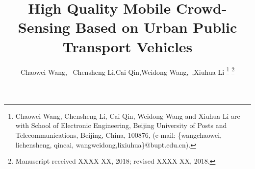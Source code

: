 \documentclass[journal]{IEEEtran}
\begin{document}
%
\title{High Quality Mobile Crowd-Sensing Based on Urban Public Transport Vehicles }
%
%
%

\author{Chaowei Wang,~
	    Chensheng Li,Cai Qin,Weidong Wang,~,Xiuhua Li
\thanks{Chaowei Wang, Chensheng Li, Cai Qin, Weidong Wang and Xiuhua Li are with School of Electronic Engineering, Beijing University of Posts and Telecommunications, Beijing, China, 100876, (e-mail: \{wangchaowei, lichensheng, qincai, wangweidong,lixiuhua\}@bupt.edu.cn).}%
\thanks{Manuscript received XXXX XX, 2018; revised XXXX XX, 2018.}}

% 
%
\end{document}

